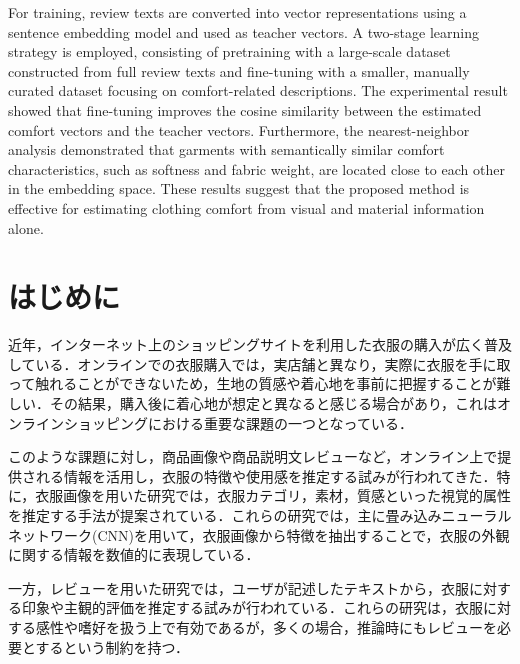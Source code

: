 \documentclass[a4paper,12pt]{jreport}
\begin{document}
For training, review texts are converted into vector representations using a sentence embedding model and used as teacher vectors. A two-stage learning strategy is employed, consisting of pretraining with a large-scale dataset constructed from full review texts and fine-tuning with a smaller, manually curated dataset focusing on comfort-related descriptions. The experimental result showed that fine-tuning improves the cosine similarity between the estimated comfort vectors and the teacher vectors. Furthermore, the nearest-neighbor analysis demonstrated that garments with semantically similar comfort characteristics, such as softness and fabric weight, are located close to each other in the embedding space. These results suggest that the proposed method is effective for estimating clothing comfort from visual and material information alone.


\clearpage


\tableofcontents

\clearpage
{}
\listoffigures
\clearpage
{}
\listoftables


\clearpage
{}

\chapter{はじめに}

近年，インターネット上のショッピングサイトを利用した衣服の購入が広く普及している．オンラインでの衣服購入では，実店舗と異なり，実際に衣服を手に取って触れることができないため，生地の質感や着心地を事前に把握することが難しい．その結果，購入後に着心地が想定と異なると感じる場合があり，これはオンラインショッピングにおける重要な課題の一つとなっている\cite{Park}．

このような課題に対し，商品画像や商品説明文レビューなど，オンライン上で提供される情報を活用し，衣服の特徴や使用感を推定する試みが行われてきた．特に，衣服画像を用いた研究では，衣服カテゴリ，素材，質感といった視覚的属性を推定する手法が提案されている\cite{LiuZ}\cite{Bell}．これらの研究では，主に畳み込みニューラルネットワーク(CNN)を用いて，衣服画像から特徴を抽出することで，衣服の外観に関する情報を数値的に表現している．

一方，レビューを用いた研究では，ユーザが記述したテキストから，衣服に対する印象や主観的評価を推定する試みが行われている\cite{McAuley15}\cite{He}．これらの研究は，衣服に対する感性や嗜好を扱う上で有効であるが，多くの場合，推論時にもレビューを必要とするという制約を持つ．
\end{document}
